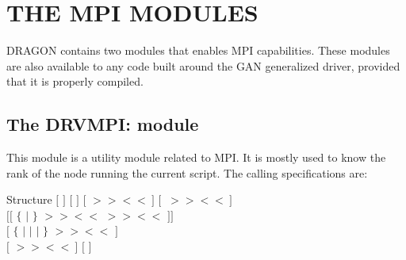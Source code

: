 \section{THE MPI MODULES}\label{sect:MPIModuleInput}

DRAGON contains two modules that enables MPI capabilities. These modules are also available to any code built
around the GAN generalized driver\cite{utilitaire}, provided that it is properly compiled.

\subsection{The DRVMPI: module}\label{sect:DRVMPIData}

This module is a utility module related to MPI. It is mostly used to know the rank of the node running the current script. The calling specifications are:

\begin{DataStructure}{Structure }
$[$  \moc{:=} $]$  \moc{::} $[$   $]$ $[$  $>>$$<<~]$ $[~$ $>>$$<<~]$ \\ $[[$  $\{$  $|$  $\}$  $>>$$<<$ $>>$$<<$ $]]$ \\ $[$  $\{$  $|$  $|$  $|$  $\}$  $>>$$<<$ $]$ \\ $[$  $>>$$<<~]$ $[$  $]$ \moc{;} \\
\end{DataStructure}

